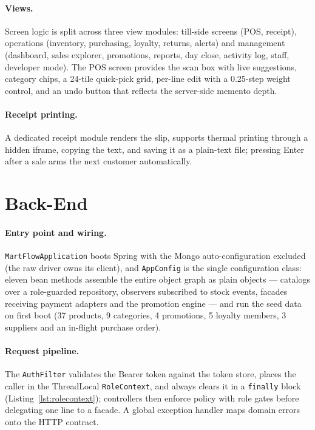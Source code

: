 \documentclass[12pt,a4paper]{report}
\begin{document}
\paragraph{Views.} Screen logic is split across three view modules: till-side screens
(POS, receipt), operations (inventory, purchasing, loyalty, returns, alerts) and
management (dashboard, sales explorer, promotions, reports, day close, activity log,
staff, developer mode). The POS screen provides the scan box with live suggestions,
category chips, a 24-tile quick-pick grid, per-line edit with a 0.25-step weight control,
and an undo button that reflects the server-side memento depth.

\paragraph{Receipt printing.} A dedicated receipt module renders the slip, supports
thermal printing through a hidden iframe, copying the text, and saving it as a plain-text
file; pressing Enter after a sale arms the next customer automatically.

\section{Back-End}

\paragraph{Entry point and wiring.} \texttt{MartFlowApplication} boots Spring with the
Mongo auto-configuration excluded (the raw driver owns its client), and
\texttt{AppConfig} is the single configuration class: eleven bean methods assemble the
entire object graph as plain objects --- catalogs over a role-guarded repository,
observers subscribed to stock events, facades receiving payment adapters and the
promotion engine --- and run the seed data on first boot (37 products, 9 categories,
4 promotions, 5 loyalty members, 3 suppliers and an in-flight purchase order).

\paragraph{Request pipeline.} The \texttt{AuthFilter} validates the Bearer token against
the token store, places the caller in the ThreadLocal \texttt{RoleContext}, and always
clears it in a \texttt{finally} block (Listing~\ref{lst:rolecontext}); controllers then
enforce policy with role gates before delegating one line to a facade. A global
exception handler maps domain errors onto the HTTP contract.
\end{document}
